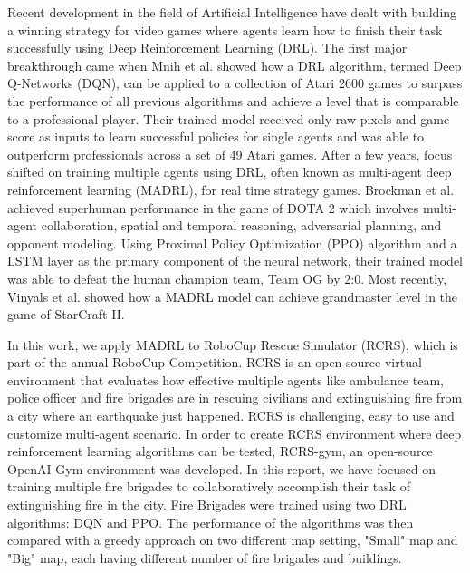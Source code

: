 \documentclass[12pt]{report}
\begin{document}
\begin{thesisabstract}               

Recent development in the field of Artificial Intelligence have dealt with building a winning strategy for video games where agents learn how to finish their task successfully using Deep Reinforcement Learning (DRL). The first major breakthrough came when Mnih et al. \cite{Mnih} showed how a DRL algorithm, termed Deep Q-Networks (DQN), can be applied to a collection of Atari 2600 games to surpass the performance of all previous algorithms and achieve a level that is comparable to a professional player. Their trained model received only raw pixels and game score as inputs to learn successful policies for single agents and was able to outperform professionals across a set of 49 Atari games. After a few years, focus shifted on training multiple agents using DRL, often known as multi-agent deep reinforcement learning (MADRL), for real time strategy games. Brockman et al. \cite{dota2} achieved superhuman performance in the game of DOTA 2 which involves multi-agent collaboration, spatial and temporal reasoning, adversarial planning, and opponent modeling. Using Proximal Policy Optimization (PPO) algorithm and a LSTM layer as the primary component of the neural network, their trained model was able to defeat the human champion team, Team OG by 2:0. Most recently, Vinyals et al. \cite{Starcraft2} showed how a MADRL model can achieve grandmaster level in the game of StarCraft II.  


In this work, we apply MADRL to RoboCup Rescue Simulator (RCRS), which is part of the annual RoboCup Competition. RCRS is an open-source virtual environment that evaluates how effective multiple agents like ambulance team, police officer and fire brigades are in rescuing civilians and extinguishing fire from a city where an earthquake just happened. RCRS is challenging, easy to use and customize multi-agent scenario. In order to create RCRS environment where deep reinforcement learning algorithms can be tested, RCRS-gym, an open-source OpenAI Gym environment was developed. In this report, we have focused on training multiple fire brigades to collaboratively accomplish their task of extinguishing fire in the city. Fire Brigades were trained using two DRL algorithms: DQN and PPO. The performance of the algorithms was then compared with a greedy approach on two different map setting, "Small" map and "Big" map, each having different number of fire brigades and buildings. 


\end{thesisabstract}
\end{document}

